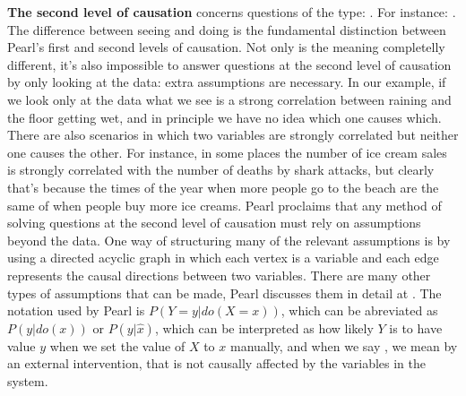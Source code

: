 \textbf{The second level of causation} concerns questions of the type: . For instance: . The difference between seeing and doing is the fundamental distinction between Pearl's first and second levels of causation. Not only is the meaning completelly different, it's also impossible to answer questions at the second level of causation by only looking at the data: extra assumptions are necessary. In our example, if we look only at the data what we see is a strong correlation between raining and the floor getting wet, and in principle we have no idea which one causes which. There are also scenarios in which two variables are strongly correlated but neither one causes the other. For instance, in some places the number of ice cream sales is strongly correlated with the number of deaths by  shark attacks, but clearly that's because the times of the year when more people go to the beach are the same of when people buy more ice creams. Pearl proclaims that any method of solving questions at the second level of causation must rely on assumptions beyond the data. One way of structuring many of the relevant assumptions is by using a directed acyclic graph in which each vertex is a variable and each edge represents the causal directions between two variables. There are many other types of assumptions that can be made, Pearl discusses them in detail at \cite{Causality}. The notation used by Pearl is $P(Y=y|do(X=x))$, which can be abreviated as $P(y|do(x))$ or $P(y|\hat{x})$, which can be interpreted as how likely $Y$ is to have value $y$ when we set the value of $X$ to $x$ manually, and when we say , we mean by an external intervention, that is not causally affected by the variables in the system. 

